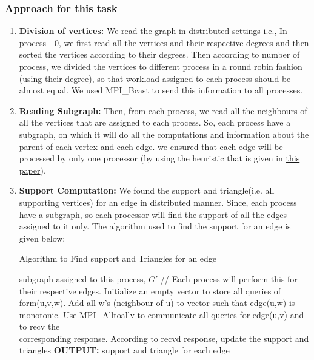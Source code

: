 \documentclass[12pt,a4paper]{article}
\begin{document}
\subsubsection{Approach for this task} 
\vspace{-2mm}
\begin{enumerate}
    \item \textbf{Division of vertices: }We read the graph in distributed settings i.e., In process - 0, we first read all the vertices and their respective degrees and then sorted the vertices according to their degrees. Then according to number of process, we divided the vertices to different process in a round robin fashion (using their degree), so that workload assigned to each process should be almost equal. We used MPI\_Bcast to send this information to all processes. 

    \item \textbf{Reading Subgraph: }Then, from each process, we read all the neighbours of all the vertices that are assigned to each process. So, each process have a subgraph, on which it will do all the computations and information about the parent of each vertex and each edge. we ensured that each edge will be processed by only one processor (by using the heuristic that is given in \href{https://link.springer.com/chapter/10.1007/978-3-319-96983-1_50}{this paper}). 

    \item \textbf{Support Computation: }We found the support and triangle(i.e. all supporting vertices) for an edge in distributed manner. Since, each process have a subgraph, so each processor will find the support of all the edges assigned to it only. The algorithm used to find the support for an edge is given below:

    \begin{algorithm}
    \caption{Algorithm to Find support and Triangles for an edge}
    \label{algo1}
        \begin{algorithmic}[1]
            \REQUIRE subgraph assigned to this process, $G'$
            \STATE // Each process will perform this for their respective edges.
                \STATE Initialize an empty vector to store all queries of form(u,v,w).
                \STATE Add all w's (neighbour of u) to vector such that edge(u,w) is monotonic.
                \STATE Use MPI\_Alltoallv to communicate all queries for edge(u,v) and to recv the\\ corresponding response. 
                \STATE According to recvd response, update the support and triangles 
            \ENDFOR
            \STATE \textbf{OUTPUT: } support and triangle for each edge 
        \end{algorithmic}
    \end{algorithm}


\end{enumerate}
\end{document}
